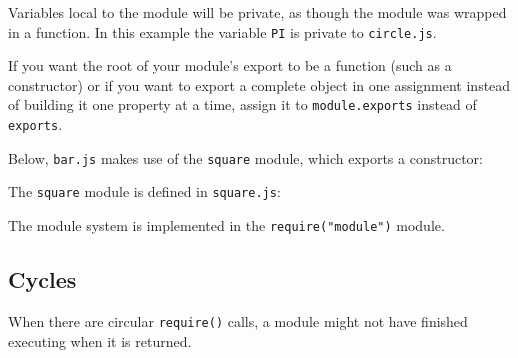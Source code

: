 Variables local to the module will be private, as though the module was
wrapped in a function. In this example the variable \texttt{PI} is
private to \texttt{circle.js}.

If you want the root of your module's export to be a function (such as a
constructor) or if you want to export a complete object in one
assignment instead of building it one property at a time, assign it to
\texttt{module.exports} instead of \texttt{exports}.

Below, \texttt{bar.js} makes use of the \texttt{square} module, which
exports a constructor:

\begin{Shaded}
\begin{Highlighting}[]
 \NormalTok{(}\NormalTok{);}
 \NormalTok{(}\NormalTok{);}
\NormalTok{(} \NormalTok{+ }\NormalTok{());}
\end{Highlighting}
\end{Shaded}

The \texttt{square} module is defined in \texttt{square.js}:

\begin{Shaded}
\begin{Highlighting}[]
 \NormalTok{= }
   \NormalTok{\{}
    \NormalTok{: }\NormalTok{() \{}
       
    \NormalTok{\}}
  \NormalTok{\};}
\NormalTok{\}}
\end{Highlighting}
\end{Shaded}

The module system is implemented in the \texttt{require("module")}
module.

\subsection{Cycles}\label{cycles}

When there are circular \texttt{require()} calls, a module might not
have finished executing when it is returned.

